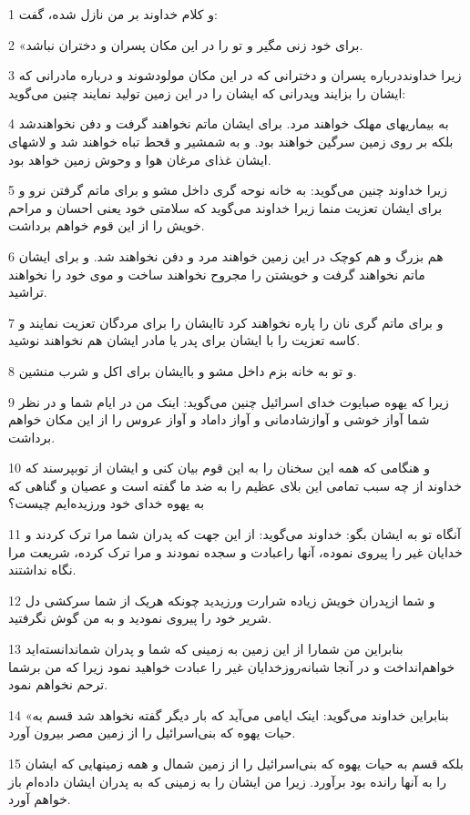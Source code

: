 \par 1 و کلام خداوند بر من نازل شده، گفت:
\par 2 «برای خود زنی مگیر و تو را در این مکان پسران و دختران نباشد.
\par 3 زیرا خداونددرباره پسران و دخترانی که در این مکان مولودشوند و درباره مادرانی که ایشان را بزایند وپدرانی که ایشان را در این زمین تولید نمایند چنین می‌گوید:
\par 4 به بیماریهای مهلک خواهند مرد. برای ایشان ماتم نخواهند گرفت و دفن نخواهندشد بلکه بر روی زمین سرگین خواهند بود. و به شمشیر و قحط تباه خواهند شد و لاشهای ایشان غذای مرغان هوا و وحوش زمین خواهد بود.
\par 5 زیرا خداوند چنین می‌گوید: به خانه نوحه گری داخل مشو و برای ماتم گرفتن نرو و برای ایشان تعزیت منما زیرا خداوند می‌گوید که سلامتی خود یعنی احسان و مراحم خویش را از این قوم خواهم برداشت.
\par 6 هم بزرگ و هم کوچک در این زمین خواهند مرد و دفن نخواهند شد. و برای ایشان ماتم نخواهند گرفت و خویشتن را مجروح نخواهند ساخت و موی خود را نخواهند تراشید.
\par 7 و برای ماتم گری نان را پاره نخواهند کرد تاایشان را برای مردگان تعزیت نمایند و کاسه تعزیت را با ایشان برای پدر یا مادر ایشان هم نخواهند نوشید.
\par 8 و تو به خانه بزم داخل مشو و باایشان برای اکل و شرب منشین.
\par 9 زیرا که یهوه صبایوت خدای اسرائیل چنین می‌گوید: اینک من در ایام شما و در نظر شما آواز خوشی و آوازشادمانی و آواز داماد و آواز عروس را از این مکان خواهم برداشت.
\par 10 و هنگامی که همه این سخنان را به این قوم بیان کنی و ایشان از توبپرسند که خداوند از چه سبب تمامی این بلای عظیم را به ضد ما گفته است و عصیان و گناهی که به یهوه خدای خود ورزیده‌ایم چیست؟
\par 11 آنگاه تو به ایشان بگو: خداوند می‌گوید: از این جهت که پدران شما مرا ترک کردند و خدایان غیر را پیروی نموده، آنها راعبادت و سجده نمودند و مرا ترک کرده، شریعت مرا نگاه نداشتند.
\par 12 و شما ازپدران خویش زیاده شرارت ورزیدید چونکه هریک از شما سرکشی دل شریر خود را پیروی نمودید و به من گوش نگرفتید.
\par 13 بنابراین من شمارا از این زمین به زمینی که شما و پدران شماندانسته‌اید خواهم‌انداخت و در آنجا شبانه‌روزخدایان غیر را عبادت خواهید نمود زیرا که من برشما ترحم نخواهم نمود.
\par 14 «بنابراین خداوند می‌گوید: اینک ایامی می‌آید که بار دیگر گفته نخواهد شد قسم به حیات یهوه که بنی‌اسرائیل را از زمین مصر بیرون آورد.
\par 15 بلکه قسم به حیات یهوه که بنی‌اسرائیل را از زمین شمال و همه زمینهایی که ایشان را به آنها رانده بود برآورد. زیرا من ایشان را به زمینی که به پدران ایشان داده‌ام باز خواهم آورد.
